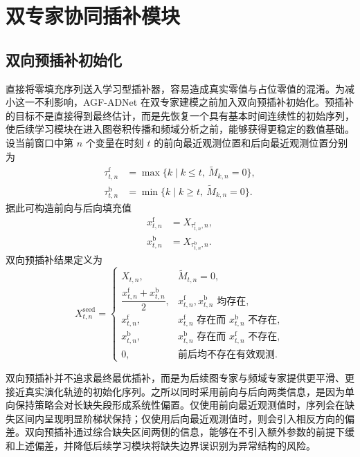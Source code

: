 \section{双专家协同插补模块}

\subsection{双向预插补初始化}

直接将零填充序列送入学习型插补器，容易造成真实零值与占位零值的混淆。为减小这一不利影响，AGF-ADNet 在双专家建模之前加入双向预插补初始化。预插补的目标不是直接得到最终估计，而是先恢复一个具有基本时间连续性的初始序列，使后续学习模块在进入图卷积传播和频域分析之前，能够获得更稳定的数值基础。设当前窗口中第 $n$ 个变量在时刻 $t$ 的前向最近观测位置和后向最近观测位置分别为
\begin{align}
    \tau_{t,n}^{\mathrm{f}} &= \max\{k \mid k \leq t,\ \widetilde{M}_{k,n}=0\}, \\
    \tau_{t,n}^{\mathrm{b}} &= \min\{k \mid k \geq t,\ \widetilde{M}_{k,n}=0\}.
\end{align}
据此可构造前向与后向填充值
\begin{align}
    x_{t,n}^{\mathrm{f}} &= X_{\tau_{t,n}^{\mathrm{f}},n}, \\
    x_{t,n}^{\mathrm{b}} &= X_{\tau_{t,n}^{\mathrm{b}},n}.
\end{align}
双向预插补结果定义为
\begin{equation}
    X_{t,n}^{\mathrm{seed}} =
    \begin{cases}
        X_{t,n}, & \widetilde{M}_{t,n}=0, \\
        \dfrac{x_{t,n}^{\mathrm{f}} + x_{t,n}^{\mathrm{b}}}{2}, & x_{t,n}^{\mathrm{f}},x_{t,n}^{\mathrm{b}} \text{ 均存在}, \\
        x_{t,n}^{\mathrm{f}}, & x_{t,n}^{\mathrm{f}} \text{ 存在而 } x_{t,n}^{\mathrm{b}} \text{ 不存在}, \\
        x_{t,n}^{\mathrm{b}}, & x_{t,n}^{\mathrm{b}} \text{ 存在而 } x_{t,n}^{\mathrm{f}} \text{ 不存在}, \\
        0, & \text{前后均不存在有效观测}.
    \end{cases}
\end{equation}

双向预插补并不追求最终最优插补，而是为后续图专家与频域专家提供更平滑、更接近真实演化轨迹的初始化序列。之所以同时采用前向与后向两类信息，是因为单向保持策略会对长缺失段形成系统性偏置。仅使用前向最近观测值时，序列会在缺失区间内呈现明显阶梯状保持；仅使用后向最近观测值时，则会引入相反方向的偏差。双向预插补通过综合缺失区间两侧的信息，能够在不引入额外参数的前提下缓和上述偏差，并降低后续学习模块将缺失边界误识别为异常结构的风险。

